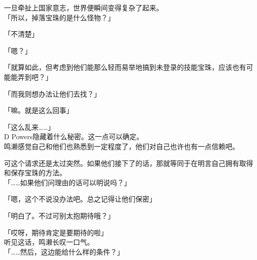 一旦牵扯上国家意志，世界便瞬间变得复杂了起来。\\

「所以，掉落宝珠的是什么怪物？」

「不清楚」

「嗯？」

「就算如此，但考虑到他们能那么轻而易举地搞到未登录的技能宝珠，应该也有可能能弄到吧？」

「而我则想办法让他们去找？」

「嘛。就是这么回事」

「这么乱来……」\\

D Powers隐藏着什么秘密。这一点可以确定。\\

鸣濑感觉自己和他们也熟悉到一定程度了，他们对自己也许也有一点信赖吧。

可这个请求还是太过突然。如果他们接下了的话，那就等同于在明言自己拥有取得和保存宝珠的方法。\\

「……如果他们问理由的话可以明说吗？」

「嗯，这个不说没办法吧。总之记得让他们保密」

「明白了。不过可别太抱期待哦？」

「哎呀，期待肯定是要期待的啦」\\

听见这话，鸣濑长叹一口气。\\

「……然后，这边能给什么样的条件？」\\

